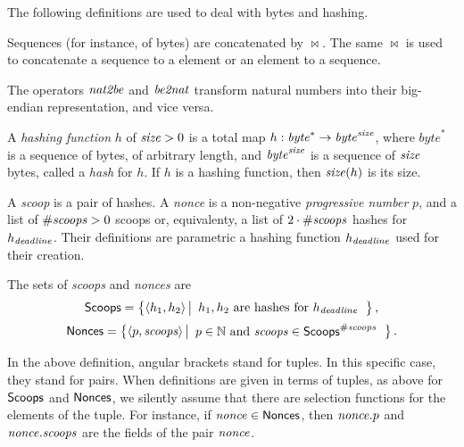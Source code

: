 The following definitions are used to deal with bytes and hashing.
%
\begin{definition}
  Sequences (for instance, of bytes) are concatenated by $\bowtie$. The same $\bowtie$
  is used to concatenate a sequence to a element or an element to a sequence.
\end{definition}
%
\begin{definition}
  The operators ${\mathit{nat2be}}$ and ${\mathit{be2nat}}$ transform natural numbers
  into their big-endian representation, and vice versa.
\end{definition}
%
\begin{definition}
  A \emph{hashing function} $h$ of ${\mathit{size}}>0$
  is a total map $h:\mathit{byte}^*\to\mathit{byte}^{\mathit{size}}$, where
  $\mathit{byte}^*$ is a sequence of bytes, of arbitrary length,
  and $\mathit{byte}^{\mathit{size}}$ is a sequence of ${\mathit{size}}$ bytes, called a \emph{hash} for $h$.
  If $h$ is a hashing function, then ${\mathit{size}}(h)$ is its size.
\end{definition}

A \emph{scoop} is a pair of hashes.
A \emph{nonce} is a non-negative \emph{progressive number} $p$, and
a list of ${\#\mathit{scoops}}>0$ scoops or, equivalenty,
a list of $2\cdot{\#\mathit{scoops}}$ hashes for $h_{\mathit{deadline}}$.
Their definitions are parametric \wrt a hashing
function $h_{\mathit{deadline}}$ used for their creation.
%
\begin{definition}
  The sets of \emph{scoops} and \emph{nonces} are
  \[
  {\mathsf{Scoops}}=\left\{\langle h_1,h_2\rangle\left|\begin{array}{l}
  h_1,h_2\text{ are hashes for }h_{\mathit{deadline}}
  \end{array}\right.\right\},
  \]
  \[
  {\mathsf{Nonces}}=\left\{\langle p,{\mathit{scoops}}\rangle\left|\begin{array}{l}
  p\in\mathbb{N}\text{ and }{\mathit{scoops}}\in{\mathsf{Scoops}}^{\#\mathit{scoops}}
  \end{array}\right.\right\}.
  \]
\end{definition}
%
In the above definition, angular brackets stand for tuples. In this specific
case, they stand for pairs. When definitions are given in terms of tuples, as above
for ${\mathsf{Scoops}}$ and ${\mathsf{Nonces}}$, we silently assume that there are selection functions
for the elements of the tuple. For instance, if ${\mathit{nonce}}\in{\mathsf{Nonces}}$, then ${\mathit{nonce}}.p$
and ${\mathit{nonce}}.{\mathit{scoops}}$ are the fields of the pair ${\mathit{nonce}}$.

